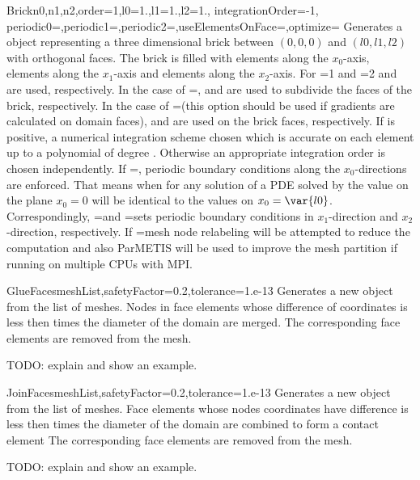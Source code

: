 \begin{funcdesc}{Brick}{n0,n1,n2,order=1,l0=1.,l1=1.,l2=1., integrationOrder=-1, \\
  periodic0=\False,periodic1=\False,periodic2=\False,useElementsOnFace=\False,optimize=\False}
Generates a \Domain object representing a three dimensional brick between
$(0,0,0)$ and $(l0,l1,l2)$ with orthogonal faces. The brick is filled with
 elements along the $x_0$-axis, 
 elements along the $x_1$-axis and 
 elements along the $x_2$-axis. 
For =1 and =2
 and  
 are used, respectively. 
In the case of =\False,
 and  
 are used to subdivide the faces of the brick, respectively. 
In the case of =\True (this option should be used if gradients
are calculated on domain faces),
 and  
 are used on the brick faces, respectively.  
If  is positive, a numerical integration scheme
chosen which is accurate on each element up to a polynomial of
degree  . Otherwise
an appropriate integration order is chosen independently. If
=\True, periodic boundary conditions 
along the $x_0$-directions are enforced. That means when for any solution of a PDE solved by \finley
the value on the plane $x_0=0$ will be identical to the values on $x_0=\var{l0}$. Correspondingly,
=\False and =\False sets periodic boundary conditions
in $x_1$-direction and $x_2$-direction, respectively.
If =\True mesh node relabeling will be attempted to reduce the computation and also ParMETIS will be used to improve the mesh partition if running on multiple CPUs with MPI.
\end{funcdesc}

\begin{funcdesc}{GlueFaces}{meshList,safetyFactor=0.2,tolerance=1.e-13}
Generates a new \Domain object from the list  of \finley meshes.
Nodes in face elements whose difference of coordinates is less then  times the 
diameter of the domain are merged. The corresponding face elements are removed from the mesh.  

TODO: explain  and show an example.
\end{funcdesc}

\begin{funcdesc}{JoinFaces}{meshList,safetyFactor=0.2,tolerance=1.e-13}
Generates a new \Domain object from the list  of \finley meshes.
Face elements whose nodes coordinates have difference is less then  times the 
diameter of the domain are combined to form a contact element  
The corresponding face elements are removed from the mesh.  

TODO: explain  and show an example.
\end{funcdesc}
